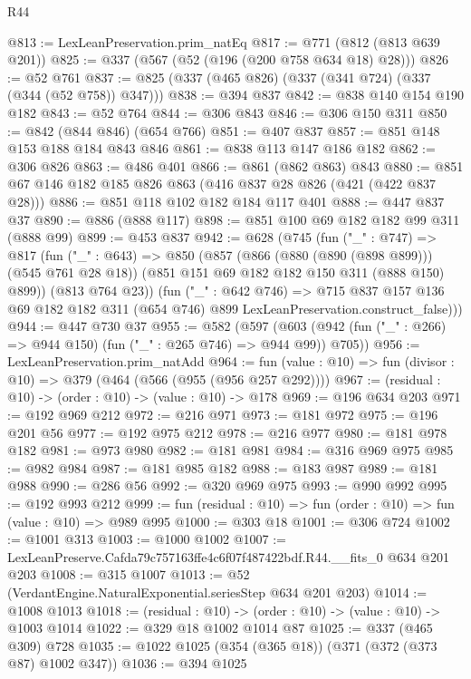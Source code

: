 \begin{lexlean}{R44}
\begin{coremodule}
@813 := LexLeanPreservation.prim_natEq
@817 := @771 (@812 (@813 @639 @201))
@825 := @337 (@567 (@52 (@196 (@200 @758 @634 @18) @28)))
@826 := @52 @761
@837 := @825 (@337 (@465 @826) (@337 (@341 @724) (@337 (@344 (@52 @758)) @347)))
@838 := @394 @837
@842 := @838 @140 @154 @190 @182
@843 := @52 @764
@844 := @306 @843
@846 := @306 @150 @311
@850 := @842 (@844 @846) (@654 @766)
@851 := @407 @837
@857 := @851 @148 @153 @188 @184 @843 @846
@861 := @838 @113 @147 @186 @182
@862 := @306 @826
@863 := @486 @401
@866 := @861 (@862 @863) @843
@880 := @851 @67 @146 @182 @185 @826 @863 (@416 @837 @28 @826 (@421 (@422 @837 @28)))
@886 := @851 @118 @102 @182 @184 @117 @401
@888 := @447 @837 @37
@890 := @886 (@888 @117)
@898 := @851 @100 @69 @182 @182 @99 @311 (@888 @99)
@899 := @453 @837
@942 := @628
    (@745
      (fun ("_" : @747) =>
      @817
        (fun ("_" : @643) =>
        @850
          (@857
            (@866 (@880 (@890 (@898 @899))) (@545 @761 @28 @18))
            (@851 @151 @69 @182 @182 @150 @311 (@888 @150) @899))
          (@813 @764 @23))
        (fun ("_" : @642 @746) =>
        @715
          @837
          @157
          @136
          @69
          @182
          @182
          @311
          (@654 @746)
          @899
          LexLeanPreservation.construct_false)))
@944 := @447 @730 @37
@955 := @582
    (@597 (@603 (@942 (fun ("_" : @266) => @944 @150) (fun ("_" : @265 @746) => @944 @99)) @705))
@956 := LexLeanPreservation.prim_natAdd
@964 := fun (value : @10) => fun (divisor : @10) => @379 (@464 (@566 (@955 (@956 @257 @292))))
@967 := (residual : @10) -> (order : @10) -> (value : @10) -> @178
@969 := @196 @634 @203
@971 := @192 @969 @212
@972 := @216 @971
@973 := @181 @972
@975 := @196 @201 @56
@977 := @192 @975 @212
@978 := @216 @977
@980 := @181 @978 @182
@981 := @973 @980
@982 := @181 @981
@984 := @316 @969 @975
@985 := @982 @984
@987 := @181 @985 @182
@988 := @183 @987
@989 := @181 @988
@990 := @286 @56
@992 := @320 @969 @975
@993 := @990 @992
@995 := @192 @993 @212
@999 := fun (residual : @10) => fun (order : @10) => fun (value : @10) => @989 @995
@1000 := @303 @18
@1001 := @306 @724
@1002 := @1001 @313
@1003 := @1000 @1002
@1007 := LexLeanPreserve.Cafda79c757163ffe4c6f07f487422bdf.R44.__fits_0 @634 @201 @203
@1008 := @315 @1007
@1013 := @52 (VerdantEngine.NaturalExponential.seriesStep @634 @201 @203)
@1014 := @1008 @1013
@1018 := (residual : @10) -> (order : @10) -> (value : @10) -> @1003 @1014
@1022 := @329 @18 @1002 @1014 @87
@1025 := @337 (@465 @309) @728
@1035 := @1022 @1025 (@354 (@365 @18)) (@371 (@372 (@373 @87) @1002 @347))
@1036 := @394 @1025

\end{coremodule}
\end{lexlean}
